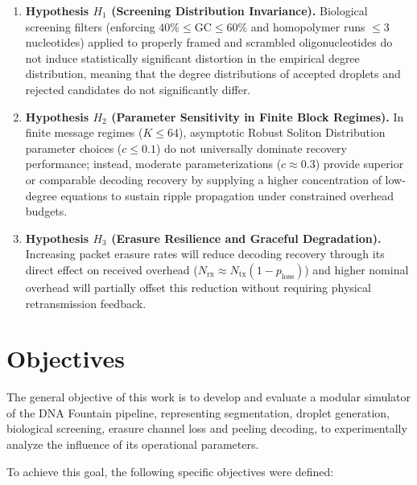 \begin{enumerate}
    \item \textbf{Hypothesis $H_1$ (Screening Distribution Invariance).} Biological screening filters (enforcing $40\% \le \text{GC} \le 60\%$ and homopolymer runs $\le 3$ nucleotides) applied to properly framed and scrambled oligonucleotides do not induce statistically significant distortion in the empirical degree distribution, meaning that the degree distributions of accepted droplets and rejected candidates do not significantly differ.
    
    \item \textbf{Hypothesis $H_2$ (Parameter Sensitivity in Finite Block Regimes).} In finite message regimes ($K \le 64$), asymptotic Robust Soliton Distribution parameter choices ($c \le 0.1$) do not universally dominate recovery performance; instead, moderate parameterizations ($c \approx 0.3$) provide superior or comparable decoding recovery by supplying a higher concentration of low-degree equations to sustain ripple propagation under constrained overhead budgets.
    
    \item \textbf{Hypothesis $H_3$ (Erasure Resilience and Graceful Degradation).} Increasing packet erasure rates will reduce decoding recovery through its direct effect on received overhead ($N_{\text{rx}} \approx N_{\text{tx}}(1 - p_{\text{loss}})$) and higher nominal overhead will partially offset this reduction without requiring physical retransmission feedback.
\end{enumerate}

\section{Objectives}

The general objective of this work is to develop and evaluate a modular simulator of the DNA Fountain pipeline, representing segmentation, droplet generation, biological screening, erasure channel loss and peeling decoding, to experimentally analyze the influence of its operational parameters.

To achieve this goal, the following specific objectives were defined:

